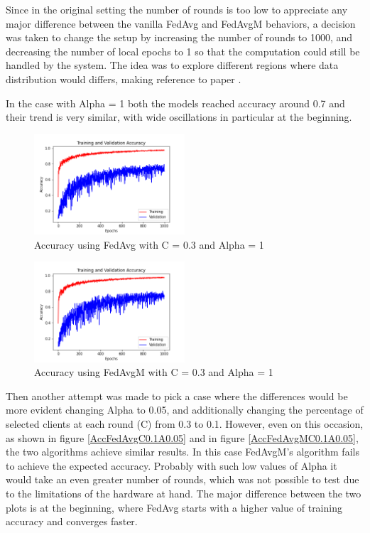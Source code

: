 \documentclass[twocolumn]{article}
\begin{document}
Since in the original setting the number of rounds is too low to appreciate any major difference between the vanilla FedAvg and FedAvgM behaviors, a decision was taken to change the setup by increasing the number of rounds to 1000, and decreasing the number of local epochs to 1 so that the computation could still be handled by the system.
The idea was to explore different regions where data distribution would differs, making reference to paper \cite{DBLP:journals/corr/KonecnyMYRSB16}.


In the case with Alpha = 1 both the models reached accuracy around 0.7 and their trend is very similar, with wide oscillations in particular at the beginning.

\begin{figure}
    \centering
    \includegraphics[width=0.5\textwidth,height=.3\textheight]{9_AccuracyFedAvg_C0.3A_1.png}
    \caption{Accuracy using FedAvg with C = 0.3 and Alpha = 1}
     \label{AccFedAvgC0.3A1} 
\end{figure}

\begin{figure}
    \centering
    \includegraphics[width=0.5\textwidth,height=.3\textheight]{9_AccuracyFedAvgM_C0.3A_1.png}
    \caption{Accuracy using FedAvgM with C = 0.3 and Alpha = 1}
     \label{AccFedAvgMC0.3A1} 
\end{figure}

Then another attempt was made to pick a case where the differences would be more evident changing Alpha to 0.05, and additionally changing the percentage of selected clients at each round (C) from 0.3 to 0.1. 
However, even on this occasion, as shown in figure \ref{AccFedAvgC0.1A0.05} and in figure \ref{AccFedAvgMC0.1A0.05}, the two algorithms achieve similar results. In this case FedAvgM's algorithm fails to achieve the expected accuracy. Probably with such low values of Alpha it would take an even greater number of rounds, which was not possible to test due to the limitations of the hardware at hand. The major difference between the two plots is at the beginning, where FedAvg starts with a higher value of training accuracy and converges faster.
\end{document}
